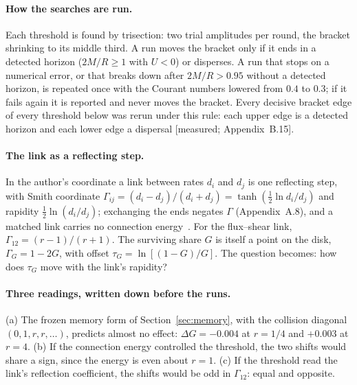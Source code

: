 \documentclass[11pt]{article}
\newcommand{\grade}[1]{\textsf{\small[#1]}}
\begin{document}
\paragraph{How the searches are run.} Each threshold is found by trisection: two trial amplitudes per round, the bracket shrinking to its middle third. A run moves the bracket only if it ends in a detected horizon ($2M/R\ge1$ with $U<0$) or disperses. A run that stops on a numerical error, or that breaks down after $2M/R>0.95$ without a detected horizon, is repeated once with the Courant numbers lowered from $0.4$ to $0.3$; if it fails again it is reported and never moves the bracket. Every decisive bracket edge of every threshold below was rerun under this rule: each upper edge is a detected horizon and each lower edge a dispersal \grade{measured; Appendix~B.15}.

\paragraph{The link as a reflecting step.} In the author's coordinate a link between rates $d_i$ and $d_j$ is one reflecting step, with Smith coordinate $\Gamma_{ij}=(d_i-d_j)/(d_i+d_j)=\tanh(\tfrac12\ln d_i/d_j)$ and rapidity $\tfrac12\ln(d_i/d_j)$; exchanging the ends negates $\Gamma$ (Appendix~A.8), and a matched link carries no connection energy~\cite{CE}. For the flux--shear link, $\Gamma_{12}=(r-1)/(r+1)$. The surviving share $G$ is itself a point on the disk, $\Gamma_G=1-2G$, with offset $\tau_G=\ln[(1-G)/G]$. The question becomes: how does $\tau_G$ move with the link's rapidity?

\paragraph{Three readings, written down before the runs.} (a) The frozen memory form of Section~\ref{sec:memory}, with the collision diagonal $(0,1,r,r,\dots)$, predicts almost no effect: $\Delta G=-0.004$ at $r=1/4$ and $+0.003$ at $r=4$. (b) If the connection energy controlled the threshold, the two shifts would share a sign, since the energy is even about $r=1$. (c) If the threshold read the link's reflection coefficient, the shifts would be odd in $\Gamma_{12}$: equal and opposite.
\end{document}
